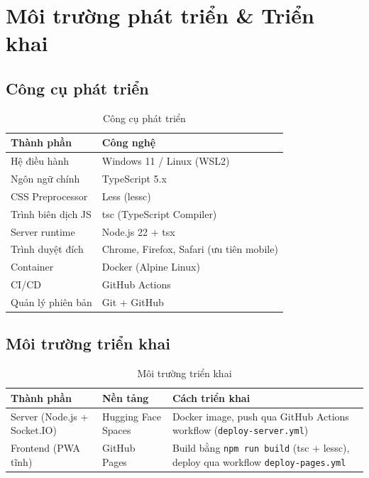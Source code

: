 \newpage

\section{Môi trường phát triển \& Triển khai}

\subsection{Công cụ phát triển}

\begin{table}[H]
    \centering
    \renewcommand{\arraystretch}{1.3}
    \setlength{\tabcolsep}{6pt}
    \begin{tabular}{|l|l|}
        \hline
        \rowcolor[rgb]{0.8, 0.9, 1.0}
        \textbf{Thành phần} & \textbf{Công nghệ} \\
        \hline
        Hệ điều hành & Windows 11 / Linux (WSL2) \\
        Ngôn ngữ chính & TypeScript 5.x \\
        CSS Preprocessor & Less (lessc) \\
        Trình biên dịch JS & tsc (TypeScript Compiler) \\
        Server runtime & Node.js 22 + tsx \\
        Trình duyệt đích & Chrome, Firefox, Safari (ưu tiên mobile) \\
        Container & Docker (Alpine Linux) \\
        CI/CD & GitHub Actions \\
        Quản lý phiên bản & Git + GitHub \\
        \hline
    \end{tabular}
    \caption{Công cụ phát triển}
\end{table}

\subsection{Môi trường triển khai}

\begin{table}[H]
    \centering
    \renewcommand{\arraystretch}{1.3}
    \setlength{\tabcolsep}{6pt}
    \begin{tabular}{|l|l|p{6cm}|}
        \hline
        \rowcolor[rgb]{0.8, 0.9, 1.0}
        \textbf{Thành phần} & \textbf{Nền tảng} & \textbf{Cách triển khai} \\
        \hline
        Server (Node.js + Socket.IO) & Hugging Face Spaces & Docker image, push qua GitHub Actions workflow (\texttt{deploy-server.yml}) \\
        \hline
        Frontend (PWA tĩnh) & GitHub Pages & Build bằng \texttt{npm run build} (tsc + lessc), deploy qua workflow \texttt{deploy-pages.yml} \\
        \hline
    \end{tabular}
    \caption{Môi trường triển khai}
\end{table}


